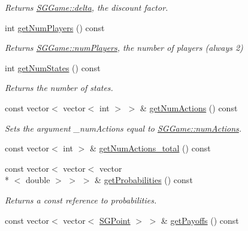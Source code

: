 \begin{DoxyCompactItemize}
\begin{DoxyCompactList}\small\item\em Returns \hyperlink{classSGGame_a5031fc31f8009c19901c0930224e0465}{S\-G\-Game\-::delta}, the discount factor. \end{DoxyCompactList}\item 
\hypertarget{classSGGame_a5ff24b055096ba5d3b7f800f40b07cb9}{int \hyperlink{classSGGame_a5ff24b055096ba5d3b7f800f40b07cb9}{get\-Num\-Players} () const }\label{classSGGame_a5ff24b055096ba5d3b7f800f40b07cb9}

\begin{DoxyCompactList}\small\item\em Returns \hyperlink{classSGGame_a6f02e3f92db6a3c5d2d9076dcb7b6d61}{S\-G\-Game\-::num\-Players}, the number of players (always 2) \end{DoxyCompactList}\item 
\hypertarget{classSGGame_a680798dd8f42a1e1cb088745e7b952af}{int \hyperlink{classSGGame_a680798dd8f42a1e1cb088745e7b952af}{get\-Num\-States} () const }\label{classSGGame_a680798dd8f42a1e1cb088745e7b952af}

\begin{DoxyCompactList}\small\item\em Returns the number of states. \end{DoxyCompactList}\item 
\hypertarget{classSGGame_a2502088ee42a763cb92e879363e48cf4}{const vector$<$ vector$<$ int $>$ $>$ \& \hyperlink{classSGGame_a2502088ee42a763cb92e879363e48cf4}{get\-Num\-Actions} () const }\label{classSGGame_a2502088ee42a763cb92e879363e48cf4}

\begin{DoxyCompactList}\small\item\em Sets the argument \-\_\-num\-Actions equal to \hyperlink{classSGGame_acebe94d195ffb67f92925bcd4c26d1a9}{S\-G\-Game\-::num\-Actions}. \end{DoxyCompactList}\item 
const vector$<$ int $>$ \& \hyperlink{classSGGame_a8b7cfd700ea2afbbe7f7a34fe6d99bf4}{get\-Num\-Actions\-\_\-total} () const 
\item 
\hypertarget{classSGGame_aef7e539a401cf805e58903c7d881f097}{const vector$<$ vector$<$ vector\\*
$<$ double $>$ $>$ $>$ \& \hyperlink{classSGGame_aef7e539a401cf805e58903c7d881f097}{get\-Probabilities} () const }\label{classSGGame_aef7e539a401cf805e58903c7d881f097}

\begin{DoxyCompactList}\small\item\em Returns a const reference to probabilities. \end{DoxyCompactList}\item 
\hypertarget{classSGGame_ad0850e478f2ef1f67c61a0aaa4506c14}{const vector$<$ vector$<$ \hyperlink{classSGPoint}{S\-G\-Point} $>$ $>$ \& \hyperlink{classSGGame_ad0850e478f2ef1f67c61a0aaa4506c14}{get\-Payoffs} () const }\label{classSGGame_ad0850e478f2ef1f67c61a0aaa4506c14}


\end{DoxyCompactItemize}
